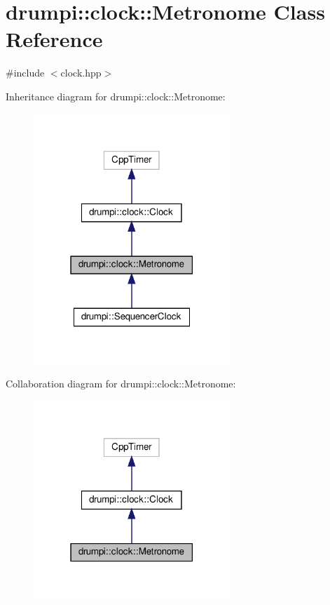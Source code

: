 \hypertarget{classdrumpi_1_1clock_1_1Metronome}{}\section{drumpi\+:\+:clock\+:\+:Metronome Class Reference}
\label{classdrumpi_1_1clock_1_1Metronome}


{\ttfamily \#include $<$clock.\+hpp$>$}



Inheritance diagram for drumpi\+:\+:clock\+:\+:Metronome\+:
\nopagebreak
\begin{figure}[H]
\begin{center}
\leavevmode
\includegraphics[width=210pt]{classdrumpi_1_1clock_1_1Metronome__inherit__graph}
\end{center}
\end{figure}


Collaboration diagram for drumpi\+:\+:clock\+:\+:Metronome\+:
\nopagebreak
\begin{figure}[H]
\begin{center}
\leavevmode
\includegraphics[width=210pt]{classdrumpi_1_1clock_1_1Metronome__coll__graph}
\end{center}
\end{figure}

